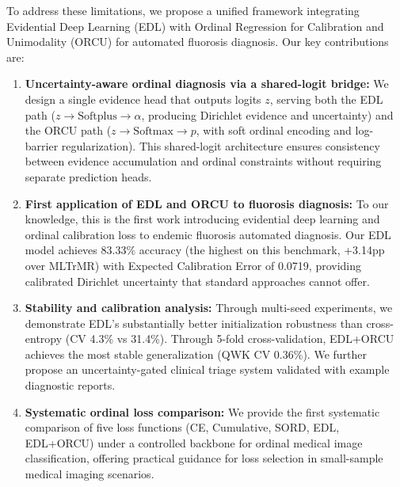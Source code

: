To address these limitations, we propose a unified framework integrating Evidential Deep Learning (EDL) \cite{sensoy2018edl} with Ordinal Regression for Calibration and Unimodality (ORCU) \cite{kim2025orcu} for automated fluorosis diagnosis. Our key contributions are:

\begin{enumerate}
    \item \textbf{Uncertainty-aware ordinal diagnosis via a shared-logit bridge:} We design a single evidence head that outputs logits $z$, serving both the EDL path ($z \to \text{Softplus} \to \alpha$, producing Dirichlet evidence and uncertainty) and the ORCU path ($z \to \text{Softmax} \to p$, with soft ordinal encoding and log-barrier regularization). This shared-logit architecture ensures consistency between evidence accumulation and ordinal constraints without requiring separate prediction heads.

    \item \textbf{First application of EDL and ORCU to fluorosis diagnosis:} To our knowledge, this is the first work introducing evidential deep learning and ordinal calibration loss to endemic fluorosis automated diagnosis. Our EDL model achieves 83.33\% accuracy (the highest on this benchmark, +3.14pp over MLTrMR) with Expected Calibration Error of 0.0719, providing calibrated Dirichlet uncertainty that standard approaches cannot offer.

    \item \textbf{Stability and calibration analysis:} Through multi-seed experiments, we demonstrate EDL's substantially better initialization robustness than cross-entropy (CV 4.3\% vs 31.4\%). Through 5-fold cross-validation, EDL+ORCU achieves the most stable generalization (QWK CV 0.36\%). We further propose an uncertainty-gated clinical triage system validated with example diagnostic reports.

    \item \textbf{Systematic ordinal loss comparison:} We provide the first systematic comparison of five loss functions (CE, Cumulative, SORD, EDL, EDL+ORCU) under a controlled backbone for ordinal medical image classification, offering practical guidance for loss selection in small-sample medical imaging scenarios.
\end{enumerate}
